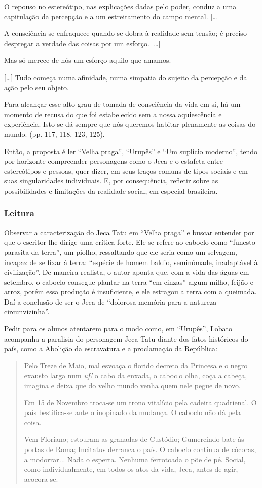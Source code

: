 \documentclass[12pt]{extarticle}
\begin{document}
O repouso no estereótipo, nas explicações dadas pelo poder, conduz a uma
capitulação da percepção e a um estreitamento do campo mental.
{[}\ldots{}{]}

A consciência se enfraquece quando se dobra à realidade sem tensão; é
preciso despregar a verdade das coisas por um esforço. {[}\ldots{}{]}

Mas só merece de nós um esforço aquilo que amamos.

{[}\ldots{}{]} Tudo começa numa afinidade, numa simpatia do sujeito da
percepção e da ação pelo seu objeto.

Para alcançar esse alto grau de tomada de consciência da vida em si, há
um momento de recusa do que foi estabelecido sem a nossa aquiescência e
experiência. Isto se dá sempre que nós queremos habitar plenamente as
coisas do mundo. (pp. 117, 118, 123, 125).

Então, a proposta é ler ``Velha praga'', ``Urupês'' e ``Um suplício
moderno'', tendo por horizonte compreender personagens como o Jeca e o
estafeta entre estereótipos e pessoas, quer dizer, em seus traços comuns
de tipos sociais e em suas singularidades individuais. E, por
consequência, refletir sobre as possibilidades e limitações da realidade
social, em especial brasileira.

\subsubsection{Leitura}

Observar a caracterização do Jeca Tatu em ``Velha praga'' e buscar
entender por que o escritor lhe dirige uma crítica forte. Ele se refere
ao caboclo como ``funesto parasita da terra'', um piolho, ressaltando
que ele seria como um selvagem, incapaz de se fixar à terra: ``espécie
de homem baldio, seminômade, inadaptável à civilização''. De maneira
realista, o autor aponta que, com a vida das águas em setembro, o
caboclo consegue plantar na terra ``em cinzas'' algum milho, feijão e
arroz, porém essa produção é insuficiente, e ele estragou a terra com a
queimada. Daí a conclusão de ser o Jeca de ``dolorosa memória para a
natureza circunvizinha''.

Pedir para os alunos atentarem para o modo como, em ``Urupês'', Lobato
acompanha a paralisia do personagem Jeca Tatu diante dos fatos
históricos do país, como a Abolição da escravatura e a proclamação da
República:

\begin{quote}
Pelo Treze de Maio, mal esvoaça o florido decreto da Princesa e o negro
exausto larga num \emph{uf!} o cabo da enxada, o caboclo olha, coça a
cabeça, imagina e deixa que do velho mundo venha quem nele pegue de
novo.

Em 15 de Novembro troca-se um trono vitalício pela cadeira quadrienal. O
país bestifica-se ante o inopinado da mudança. O caboclo não dá pela
coisa.

Vem Floriano; estouram as granadas de Custódio; Gumercindo bate às
portas de Roma; Incitatus derranca o país. O caboclo continua de
cócoras, a modorrar... Nada o esperta. Nenhuma ferrotoada o põe de pé.
Social, como individualmente, em todos os atos da vida, Jeca, antes de
agir, acocora-se.
\end{quote}
\end{document}
